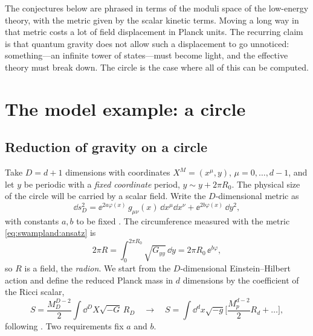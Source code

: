 \begin{physicsbox}
The conjectures below are phrased in terms of the moduli space of the low-energy theory, with the
metric given by the scalar kinetic terms. Moving a long way in that metric costs a lot of field
displacement in Planck units. The recurring claim is that quantum gravity does not allow such a
displacement to go unnoticed: something---an infinite tower of states---must become light, and the
effective theory must break down. The circle is the case where all of this can be computed.
\end{physicsbox}

\section{The model example: a circle}\label{sec:swampland:circle}

\subsection{Reduction of gravity on a circle}

Take $D=d+1$ dimensions with coordinates $X^M=(x^\mu,y)$, $\mu=0,\dots,d-1$, and let $y$ be
periodic with a \emph{fixed coordinate} period, $y\sim y+2\pi R_0$. The physical size of the circle
will be carried by a scalar field. Write the $D$-dimensional metric as
\begin{equation}\label{eq:swampland:ansatz}
\dd s_D^2 = \ee^{2a\varphi(x)}\,g_{\mu\nu}(x)\,\dd x^\mu\dd x^\nu + \ee^{2b\varphi(x)}\,\dd y^2 ,
\end{equation}
with constants $a,b$ to be fixed . The circumference measured
with the metric \eqref{eq:swampland:ansatz} is
\begin{equation}\label{eq:swampland:radius}
2\pi R = \int_0^{2\pi R_0}\sqrt{G_{yy}}\,\dd y = 2\pi R_0\,\ee^{b\varphi},
\end{equation}
so $R$ is a field, the \emph{radion}. We start from the $D$-dimensional Einstein--Hilbert action
and define the reduced Planck mass in $d$ dimensions by the coefficient of the Ricci scalar,
\begin{equation}\label{eq:swampland:eh}
S=\frac{M_D^{D-2}}{2}\int\dd^DX\sqrt{-G}\,R_D
\quad\longrightarrow\quad
S=\int\dd^dx\sqrt{-g}\Big[\frac{M_p^{d-2}}{2}R_d+\dots\Big],
\end{equation}
following . Two requirements fix $a$ and $b$.

